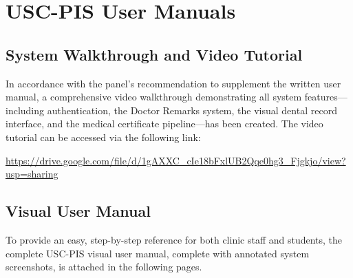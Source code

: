 
\chapter{USC-PIS User Manuals}
\label{appendix:user_manuals}

\section*{System Walkthrough and Video Tutorial}
In accordance with the panel's recommendation to supplement the written user manual, a comprehensive video walkthrough demonstrating all system features—including authentication, the Doctor Remarks system, the visual dental record interface, and the medical certificate pipeline—has been created. The video tutorial can be accessed via the following link: 

\url{https://drive.google.com/file/d/1gAXXC_cIe18bFxlUB2Qqe0hg3_Fjgkjo/view?usp=sharing}

\section*{Visual User Manual}
To provide an easy, step-by-step reference for both clinic staff and students, the complete USC-PIS visual user manual, complete with annotated system screenshots, is attached in the following pages.


